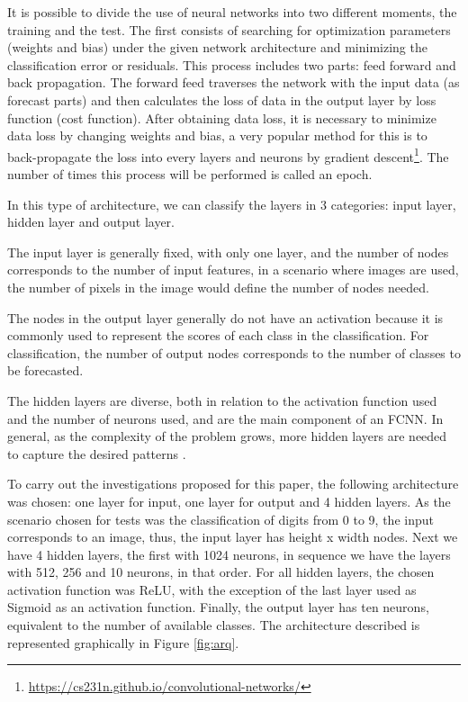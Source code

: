 \documentclass[conference]{IEEEtran}
\begin{document}
It is possible to divide the use of neural networks into two different moments, the training and the test. The first consists of searching for optimization parameters (weights and bias) under the given network architecture and minimizing the classification error or residuals. This process includes two parts: feed forward and back propagation. The forward feed traverses the network with the input data (as forecast parts) and then calculates the loss of data in the output layer by loss function (cost function). After obtaining data loss, it is necessary to minimize data loss by changing weights and bias, a very popular method for this is to back-propagate the loss into every layers and neurons by gradient descent\footnote{\url{https://cs231n.github.io/convolutional-networks/}}. The number of times this process will be performed is called an epoch.

In this type of architecture, we can classify the layers in 3 categories: input layer, hidden layer and output layer. 

The input layer is generally fixed, with only one layer, and the number of nodes corresponds to the number of input features, in a scenario where images are used, the number of pixels in the image would define the number of nodes needed.

The nodes in the output layer generally do not have an activation because it is commonly used to represent the scores of each class in the classification. For classification, the number of output nodes corresponds to the number of classes to be forecasted.

The hidden layers are diverse, both in relation to the activation function used and the number of neurons used, and are the main component of an FCNN. In general, as the complexity of the problem grows, more hidden layers are needed to capture the desired patterns \cite{kononenko2007machine}.

To carry out the investigations proposed for this paper, the following architecture was chosen: one layer for input, one layer for output and 4 hidden layers. As the scenario chosen for tests was the classification of digits from 0 to 9, the input corresponds to an image, thus, the input layer has height x width nodes. Next we have 4 hidden layers, the first with 1024 neurons, in sequence we have the layers with 512, 256 and 10 neurons, in that order. For all hidden layers, the chosen activation function was ReLU, with the exception of the last layer used as Sigmoid as an activation function. Finally, the output layer has ten neurons, equivalent to the number of available classes. The architecture described is represented graphically in Figure \ref{fig:arq}.
\end{document}
